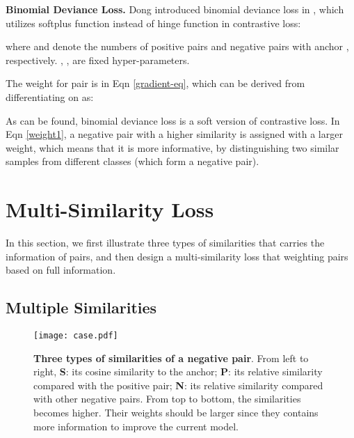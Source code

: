 \documentclass[10pt,twocolumn,letterpaper]{article}
\begin{document}
{\bf Binomial Deviance Loss.}
 Dong \etal introduced binomial deviance loss in \cite{binomial}, which utilizes softplus function instead of hinge function in contrastive loss:

where  and  denote the numbers of positive pairs and negative pairs with anchor , respectively. , ,  are fixed hyper-parameters.

The weight for pair  is   in Eqn \ref{gradient-eq}, which can be derived from differentiating  on  as:


As can be found, binomial deviance loss is a soft version of contrastive loss. In Eqn \ref{weight1}, a negative pair with a higher similarity is assigned with a larger weight, which means that it is more informative, by distinguishing two similar samples from different classes (which form a negative pair).

\section{Multi-Similarity Loss}
In this section, we first illustrate three types of similarities that carries the information of pairs, and then design a multi-similarity loss that weighting pairs based on full information.

\subsection{Multiple Similarities}

\begin{figure*}[t]
	\vspace{-5pt}
	\centering
	\texttt{[image: case.pdf]}
	
	\caption{\textbf{Three types of similarities of a negative pair}. From left to right, \textbf{S}: its cosine similarity to the anchor; \textbf{P}: its relative similarity compared with the positive pair; \textbf{N}: its relative similarity compared with other negative pairs. From top to bottom, the similarities becomes higher. Their weights should be larger since they contains more information to improve the current model.}
	\label{cases}
\end{figure*}
\end{document}
